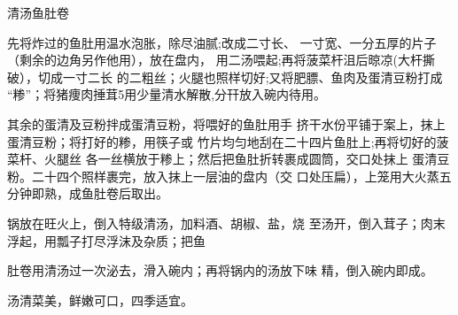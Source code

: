 \begin{recipe}{清汤鱼肚卷}

\ingredients



\cooking

\step 	先将炸过的鱼肚用温水泡胀，除尽油腻;改成二寸长、 一寸宽、一分五厚的片子（剩余的边角另作他用），放在盘内， 用二汤喂起;再将菠菜杆沮后晾凉(大杆撕破），切成一寸二长 的二粗丝；火腿也照样切好;又将肥膘、鱼肉及蛋清豆粉打成 “糁”；将猪痩肉捶茸5用少量清水解散,分幵放入碗内待用。

\step 	其余的蛋清及豆粉拌成蛋清豆粉，将喂好的鱼肚用手 挤干水份平铺于案上，抹上蛋清豆粉；将打好的糁，用筷子或 竹片均匀地刮在二十四片鱼肚上;再将切好的菠菜杆、火腿丝 各一丝横放于糁上；然后把鱼肚折转裹成圆筒，交口处抹上 蛋清豆粉。二十四个照样裹完，放入抹上一层油的盘内（交 口处压扁），上笼用大火蒸五分钟即熟，成鱼肚卷后取出。

\step 	锅放在旺火上，倒入特级清汤，加料酒、胡椒、盐，烧 至汤开，倒入茸子；肉末浮起，用瓢子打尽浮沫及杂质；把鱼

肚卷用清汤过一次泌去，滑入碗内；再将锅内的汤放下味 精，倒入碗内即成。

\notes

汤清菜美，鲜嫩可口，四季适宜。

\end{recipe}

